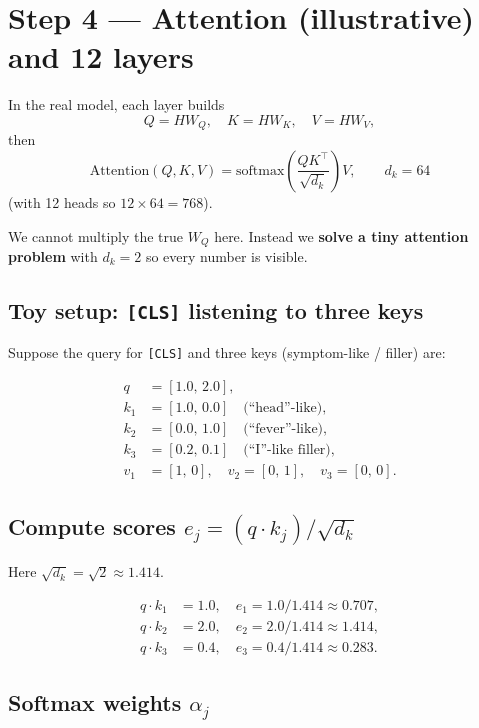 \section{Step 4 --- Attention (illustrative) and 12 layers}
\label{sec:attn}

In the real model, each layer builds
\[
  Q = H W_Q,\quad K = H W_K,\quad V = H W_V,
\]
then
\[
  \mathrm{Attention}(Q,K,V)
  = \mathrm{softmax}\!\left(\frac{QK^{\top}}{\sqrt{d_k}}\right)V,
  \qquad d_k = 64
\]
(with 12 heads so \(12\times 64 = 768\)).

We cannot multiply the true \(W_Q\) here. Instead we \textbf{solve a tiny attention problem} with \(d_k=2\) so every number is visible.

\subsection*{Toy setup: \texttt{[CLS]} listening to three keys}

Suppose the query for \texttt{[CLS]} and three keys (symptom-like / filler) are:

\begin{align*}
  q &= [1.0,\, 2.0], \\
  k_1 &= [1.0,\, 0.0] \quad\text{(``head''-like)}, \\
  k_2 &= [0.0,\, 1.0] \quad\text{(``fever''-like)}, \\
  k_3 &= [0.2,\, 0.1] \quad\text{(``I''-like filler)}, \\
  v_1 &= [1,\, 0],\quad
  v_2 = [0,\, 1],\quad
  v_3 = [0,\, 0].
\end{align*}

\subsection*{Compute scores \(e_j = (q\cdot k_j)/\sqrt{d_k}\)}

Here \(\sqrt{d_k}=\sqrt{2}\approx 1.414\).

\begin{align*}
  q\cdot k_1 &= 1.0,\quad
  e_1 = 1.0/1.414 \approx 0.707, \\
  q\cdot k_2 &= 2.0,\quad
  e_2 = 2.0/1.414 \approx 1.414, \\
  q\cdot k_3 &= 0.4,\quad
  e_3 = 0.4/1.414 \approx 0.283.
\end{align*}

\subsection*{Softmax weights \(\alpha_j\)}

